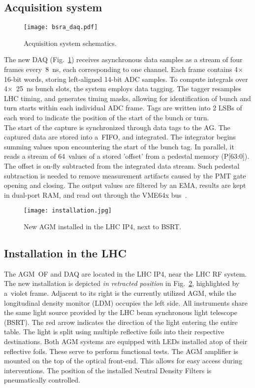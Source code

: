 \subsection{Acquisition system}
\begin{figure}[!tbh]
    \centering
    \texttt{[image: bsra\_daq.pdf]}
    \caption{Acquisition system schematics.}
    \label{fig:bsra_daq}
\end{figure}
%
The new DAQ (Fig.~\ref{fig:bsra_daq}) receives asynchronous data samples as a stream of four frames every~\SI{8}{\nano s}, each corresponding to one channel.
%
Each frame contains 4$\times$16-bit words, storing left-aligned 14-bit ADC samples. 
%
To compute integrals over 4$\times$~\SI{25}{\nano\second} bunch slots, the system employs data tagging. 
%
The tagger resamples LHC timing, and generates timing masks, allowing for identification of bunch and turn starts within each individual ADC frame.
%
Tags are written into 2 LSBs of each word to indicate the position of the start of the bunch or turn.
\\
The start of the capture is synchronized through data tags to the AG.
%
The captured data are stored into a~FIFO, and integrated. 
%
The integrator begins summing values upon encountering the start of the bunch tag.
%
In parallel, it reads a stream of 64~values of a stored 'offset' from a pedestal memory (P[63:0]).
%
The offset is on-fly subtracted from the integrated data stream. 
%
Such pedestal subtraction is needed to remove measurement artifacts caused by the PMT gate opening and closing. 
%
The output values are filtered by an EMA, results are kept in dual-port RAM, and read out through the VME64x bus~\cite{my_thesis}.

\begin{figure}[!tbh]
    \centering
    \texttt{[image: installation.jpg]}
    \caption{New AGM installed in the LHC IP4, next to BSRT.}
    \label{fig:installation}
\end{figure}

\subsection{Installation in the LHC}

The AGM~OF and DAQ are located in the LHC IP4, near the LHC RF system. The
new installation is depicted \textit{in retracted position} in Fig.~\ref{fig:installation}, highlighted by a~violet frame. Adjacent to its right is the currently utilized AGM, while
the longitudinal density monitor (LDM) occupies the left side. All instruments share the same light source
provided by the LHC beam synchronous light telescope (BSRT). The red
arrow indicates the direction of the light entering the entire table.
The light is split using multiple reflective foils into their respective destinations. Both AGM systems are equipped with LEDs installed atop of their reflective foils. These serve to perform functional tests.
The
AGM amplifier is mounted on the top of the optical front-end. This allows for easy access during interventions. The position of the installed Neutral Density Filters is pneumatically controlled.

